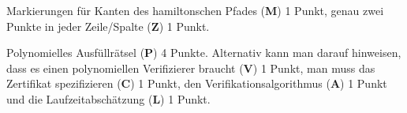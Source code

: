 \begin{bewertung}
\begin{teilaufgaben}
\item Markierungen für Kanten des hamiltonschen Pfades ({\bf M}) 1 Punkt,
genau zwei Punkte in jeder Zeile/Spalte ({\bf Z}) 1 Punkt.
\item Polynomielles Ausfüllrätsel ({\bf P}) 4 Punkte. Alternativ kann
man darauf hinweisen, dass es einen polynomiellen Verifizierer braucht
({\bf V}) 1 Punkt, man muss das Zertifikat spezifizieren ({\bf C}) 1 Punkt,
den Verifikationsalgorithmus ({\bf A}) 1 Punkt und die Laufzeitabschätzung
({\bf L}) 1 Punkt.
\end{teilaufgaben}
\end{bewertung}




